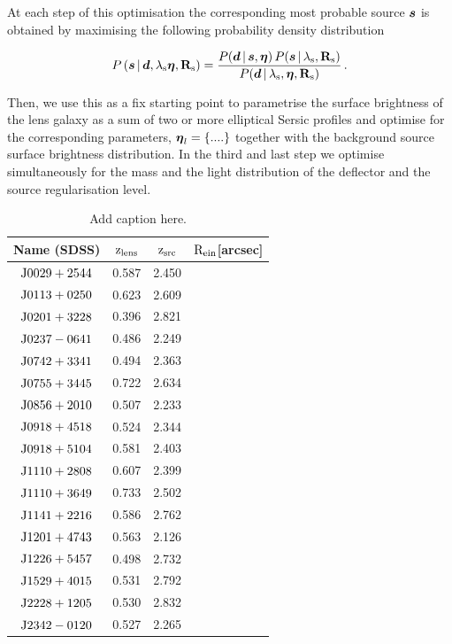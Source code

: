 \documentclass[a4paper,fleqn,usenatbib]{mnras}
\begin{document}
At each step of this optimisation the corresponding most probable source $\bmath s$ is obtained by maximising the following probability density distribution 

\begin{equation}
    P\left(\bmath s\,|\,\bmath d,\lambda_{\rm{s}}\bmath \eta,\mathbf R_{\rm{s}}\right)=\frac{P(\bmath d \,|\,\bmath s,\bmath \eta)\, P(\bmath s\,|\,\lambda_{\rm{s}},\mathbf R_{\rm{s}})}{P(\bmath     d \,|\,\lambda_{\rm{s}},\bmath \eta,\mathbf R_{\rm{s}})}\,.
   \label{eq:evidence} 
 \end{equation}

Then, we use this as a fix starting point to parametrise the surface brightness of the lens galaxy as a sum of two or more elliptical Sersic profiles and optimise for the corresponding  parameters, $\bmath \eta_l =\{....\}$ together with the background source surface brightness distribution. In the third and last step we optimise simultaneously for the mass and the light distribution of the deflector and the source regularisation level.

\begin{table}
\caption{Add caption here.}
\begin{tabular}{cccc}
\hline
 Name (SDSS) &$\rm{z_{lens}}$&$\rm{z_{src}}$&$\rm{R_{ein}}$[arcsec]\\
 \hline
$\rm{J0029+2544}$&0.587&2.450\\
$\rm{J0113+0250}$&0.623&2.609\\
$\rm{J0201+3228}$&0.396&2.821\\
$\rm{J0237-0641}$&0.486&2.249\\
$\rm{J0742+3341}$&0.494&2.363\\
$\rm{J0755+3445}$&0.722&2.634\\
$\rm{J0856+2010}$&0.507&2.233\\
$\rm{J0918+4518}$&0.524&2.344\\
$\rm{J0918+5104}$&0.581&2.403\\
$\rm{J1110+2808}$&0.607&2.399\\
$\rm{J1110+3649}$&0.733&2.502\\
$\rm{J1141+2216}$&0.586&2.762\\
$\rm{J1201+4743}$&0.563&2.126\\
$\rm{J1226+5457}$&0.498&2.732\\
$\rm{J1529+4015}$&0.531&2.792\\
$\rm{J2228+1205}$&0.530&2.832\\
$\rm{J2342-0120}$&0.527&2.265\\
 \hline
\end{tabular}
\label{tbl:list} 
\end{table}
\end{document}
